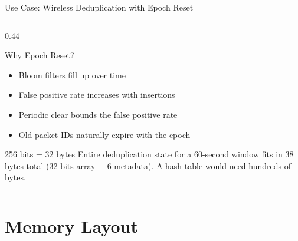 \documentclass[aspectratio=169, 10pt]{beamer}
\begin{document}
\begin{frame}[fragile]{Use Case: Wireless Deduplication with Epoch Reset}
\begin{columns}[T]
\begin{column}{0.44\textwidth}
\vspace{0.5em}
\begin{block}{Why Epoch Reset?}
\begin{itemize}
  \item Bloom filters fill up over time
  \item False positive rate increases with insertions
  \item Periodic clear bounds the false positive rate
  \item Old packet IDs naturally expire with the epoch
\end{itemize}
\end{block}

\begin{alertblock}{256 bits = 32 bytes}
Entire deduplication state for a 60-second window
fits in 38 bytes total (32 bits array + 6 metadata).
A hash table would need hundreds of bytes.
\end{alertblock}
\end{column}
\end{columns}
\end{frame}

\section{Memory Layout}
\end{document}
